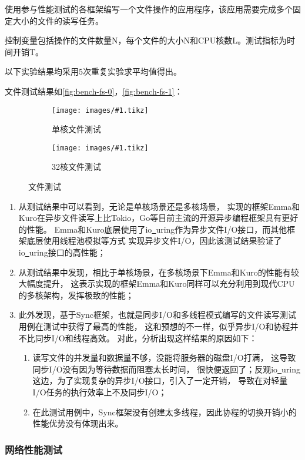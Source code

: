 \documentclass[supercite]{HustGraduPaper}
\newcommand{\cfig}[3]{
  \begin{figure}[htb]
    \centering
    \texttt{[image: images/\#1.tikz]}
    \caption{#3}
    \label{fig:#1}
  \end{figure}
}
\newcommand{\sfig}[3]{
  \begin{subfigure}[b]{#2\textwidth}
    \texttt{[image: images/\#1.tikz]}
    \caption{#3}
    \label{fig:#1}
  \end{subfigure}
}
\newcommand{\xfig}[3]{
  \begin{figure}[htb]
    \centering
    #3
    \caption{#2}
    \label{fig:#1}
  \end{figure}
}
\newcommand{\rfig}[1]{\autoref{fig:#1}}
\theoremstyle{definition}
\begin{document}
使用参与性能测试的各框架编写一个文件操作的应用程序，该应用需要完成多个固定大小的文件的读写任务。\par

控制变量包括操作的文件数量N，每个文件的大小N和CPU核数L。测试指标为时间开销T。\par

以下实验结果均采用5次重复实验求平均值得出。\par

文件测试结果如\rfig{bench-fs-0}，\rfig{bench-fs-1}：

%

\xfig{bench-fs}{文件测试}{
  \sfig{bench-fs-0}{0.4}{单核文件测试}
  \sfig{bench-fs-1}{0.4}{32核文件测试}
}


\begin{enumerate}[label={(\arabic*)}]
  \item 从测试结果中可以看到，无论是单核场景还是多核场景，
    实现的框架Emma和Kuro在异步文件读写上比Tokio，Go等目前主流的开源异步编程框架具有更好的性能。
    Emma和Kuro底层使用了io\underline{~}uring作为异步文件I/O接口，而其他框架底层使用线程池模拟等方式
    实现异步文件I/O，因此该测试结果验证了io\underline{~}uring接口的高性能；
  \item 从测试结果中发现，相比于单核场景，在多核场景下Emma和Kuro的性能有较大幅度提升，
    这表示实现的框架Emma和Kuro同样可以充分利用到现代CPU的多核架构，发挥极致的性能；
  \item 此外发现，基于Sync框架，也就是同步I/O和多线程模式编写的文件读写测试用例在测试中获得了最高的性能，
    这和预想的不一样，似乎异步I/O和协程并不比同步I/O和线程高效。
    对此，分析出现这样结果的原因如下：
    \begin{enumerate}
      \item 读写文件的并发量和数据量不够，没能将服务器的磁盘I/O打满，
        这导致同步I/O没有因为等待数据而阻塞太长时间，
        很快便返回了；反观io\underline{~}uring这边，为了实现复杂的异步I/O接口，引入了一定开销，
        导致在对轻量I/O任务的执行效率上不及同步I/O；
      \item 在此测试用例中，Sync框架没有创建太多线程，因此协程的切换开销小的性能优势没有体现出来。
    \end{enumerate}
\end{enumerate}

\subsubsection{网络性能测试}
\end{document}
